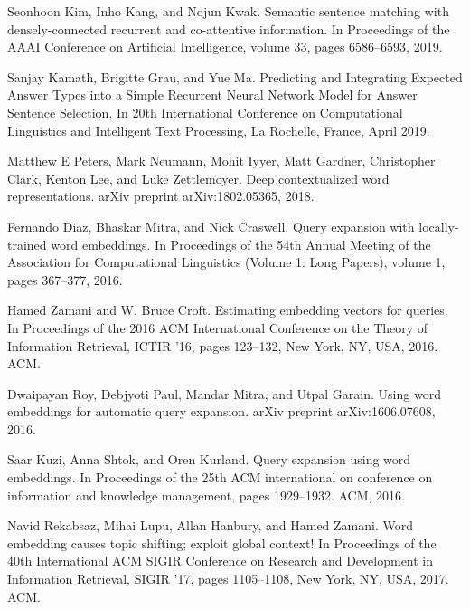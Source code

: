 \documentclass{llncs}
\begin{document}
\begin{thebibliography}{}
 Seonhoon Kim, Inho Kang, and Nojun Kwak. Semantic sentence matching with densely-connected recurrent and co-attentive information. In Proceedings of the AAAI Conference on Artificial Intelligence, volume 33, pages 6586–6593, 2019.

 Sanjay Kamath, Brigitte Grau, and Yue Ma. Predicting and Integrating Expected Answer Types into a Simple Recurrent Neural Network Model for Answer Sentence Selection. In 20th International Conference on Computational Linguistics and Intelligent Text Processing, La Rochelle, France, April 2019. 

  Matthew E Peters, Mark Neumann, Mohit Iyyer, Matt Gardner, Christopher Clark, Kenton Lee, and Luke Zettlemoyer. Deep contextualized word representations. arXiv preprint arXiv:1802.05365, 2018. 

 Fernando Diaz, Bhaskar Mitra, and Nick Craswell. Query expansion with locally-trained word embeddings. In Proceedings of the 54th Annual Meeting of the Association for Computational Linguistics (Volume 1: Long Papers), volume 1, pages 367–377, 2016.

 Hamed Zamani and W. Bruce Croft. Estimating embedding vectors for queries. In Proceedings of the 2016 ACM International Conference on the Theory of Information Retrieval, ICTIR ’16, pages 123–132, New York, NY, USA, 2016. ACM.

 Dwaipayan Roy, Debjyoti Paul, Mandar Mitra, and Utpal Garain. Using word embeddings for automatic query expansion. arXiv preprint arXiv:1606.07608, 2016.

 Saar Kuzi, Anna Shtok, and Oren Kurland. Query expansion using word embeddings. In Proceedings of the 25th ACM international on conference on information and knowledge management, pages 1929–1932. ACM, 2016.

 Navid Rekabsaz, Mihai Lupu, Allan Hanbury, and Hamed Zamani. Word embedding causes topic shifting; exploit global context! In Proceedings of the 40th International ACM SIGIR Conference on Research and Development in Information Retrieval, SIGIR ’17, pages 1105–1108, New York, NY, USA, 2017. ACM.




\end{thebibliography}
\clearpage
\clearpage
%
\end{document}
